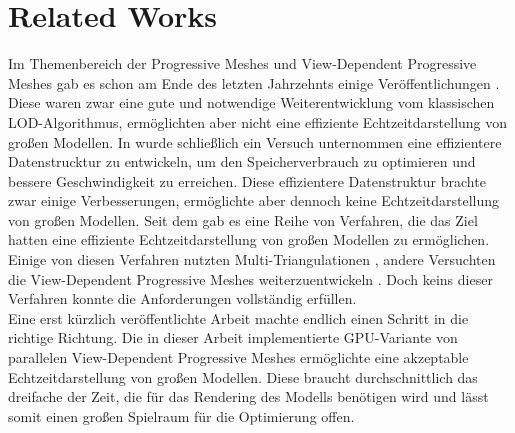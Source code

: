 \section{Related Works}
Im  Themenbereich der Progressive Meshes und View-Dependent Progressive Meshes gab es schon am Ende des letzten Jahrzehnts einige  Veröffentlichungen \cite{bib:hoppePM, bib:hoppeVPM}.  Diese waren zwar eine gute und notwendige Weiterentwicklung vom klassischen LOD-Algorithmus, ermöglichten aber nicht eine effiziente Echtzeitdarstellung von großen Modellen. In \cite{bib:efPM} wurde schließlich ein Versuch unternommen eine effizientere Datenstrucktur zu entwickeln, um den Speicherverbrauch zu optimieren und bessere Geschwindigkeit zu erreichen. Diese effizientere Datenstruktur brachte zwar einige Verbesserungen, ermöglichte aber dennoch keine  Echtzeitdarstellung von großen Modellen. 
Seit dem gab es eine Reihe von Verfahren, die das Ziel hatten eine effiziente Echtzeitdarstellung von großen Modellen zu ermöglichen. Einige von diesen Verfahren nutzten Multi-Triangulationen \cite{bib:DFMP98}, andere Versuchten die  View-Dependent Progressive Meshes weiterzuentwickeln \cite{bib:PAJ01, bib:PD04 ,bib:ESV99}. Doch keins dieser Verfahren konnte die Anforderungen vollständig erfüllen.\\
Eine erst kürzlich veröffentlichte Arbeit \cite{bib:Hoppe2009} machte endlich einen Schritt in die richtige Richtung. Die in dieser Arbeit implementierte GPU-Variante von  parallelen View-Dependent Progressive Meshes ermöglichte eine akzeptable Echtzeitdarstellung von großen Modellen. Diese braucht durchschnittlich das dreifache der Zeit, die für das Rendering des  Modells benötigen wird und lässt somit einen großen Spielraum für die Optimierung offen.  

 
